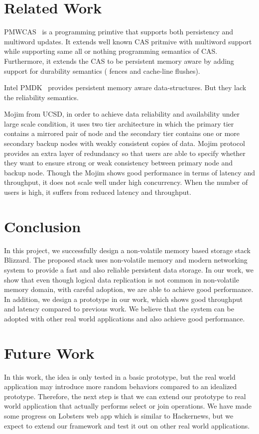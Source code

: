 			\section{Related Work}

			PMWCAS~\cite{pmwcas} is a programming primtive that supports both persistency and multiword updates.
			It extends well known CAS pritmive with multiword support while supporting same all or nothing
			programming semantics of CAS. Furthermore, it extends the CAS to be persistent memory aware by
			adding support for durability semantics ( fences and cache-line flushes).

			Intel PMDK~\cite{pmdk} provides persistent memory aware data-structures. But they lack the reliability semantics.

			Mojim from UCSD, in order to achieve data reliability and availability under large scale condition, it uses two tier architecture in which the primary tier contains a mirrored pair of node and the secondary tier contains one or more secondary backup nodes with weakly consistent copies of data. Mojim protocol provides an extra layer of redundancy so that users are able to specify whether they want to ensure strong or weak consistency between primary node and backup node. Though the Mojim shows good performance in terms of latency and throughput, it does not scale well under high concurrency. When the number of users is high, it suffers from reduced latency and throughput. 

\section{Conclusion}
In this project, we successfully design a non-volatile memory based storage stack Blizzard. The proposed stack uses non-volatile memory and modern networking system to provide a fast and also reliable persistent data storage. In our work, we show that even though logical data replication is not common in non-volatile memory domain, with careful adoption, we are able to achieve good performance. In addition, we design a prototype in our work, which shows good throughput and latency compared to previous work. We believe that the system can be adopted with other real world applications and also achieve good performance. 

\section{Future Work}
In this work, the idea is only tested in a basic prototype, but the real world application may introduce more random behaviors compared to an idealized prototype. Therefore, the next step is that we can extend our prototype to real world application that actually performs select or join operations. We have made some progress on Lobsters web app which is similar to Hackernews, but we expect to extend our framework and test it out on other real world applications. 

